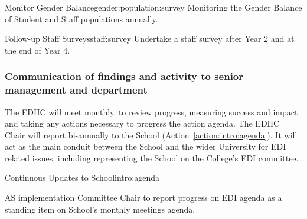 \newcommand{\actgenbalpopsurvey}{Monitoring the Gender Balance of Student and Staff populations annually.
}
\begin{actionblock}{\ksspace{}Monitor Gender Balance}{gender:population:survey}
\actgenbalpopsurvey
\hfill{
    \hypersetup{hidelinks}
    \hyperlink{a3}{\gotoactionsymbol{}}
}
\end{actionblock}

\newcommand{\actstaffsurvey}{Undertake a staff survey after Year 2 and at the end of Year 4.
}
\begin{actionblock}{\ksspace{}Follow-up Staff Surveys}{staff:survey}
\actstaffsurvey
\hfill{
    \hypersetup{hidelinks}
    \hyperlink{a3}{\gotoactionsymbol{}}
}
\end{actionblock}



\subsubsection{Communication of findings and activity to senior management and department}

The EDIIC will meet monthly, to review progress, measuring success and impact and taking any actions necessary to progress the action agenda. The EDIIC Chair will report bi-annually to the School (Action~\ref{action:intro:agenda}).
It will act as the main conduit between the School and the wider University for EDI related issues, including representing the School on the College's EDI committee.


\newcommand{\actintroagenda}{
AS implementation Committee Chair to report progress on EDI agenda as a standing item on School’s monthly meetings agenda.
}
\begin{actionblock}{\ksspace{}Continuous Updates to School}{intro:agenda}
\actintroagenda
\hfill{
    \hypersetup{hidelinks}
    \hyperlink{a5}{\gotoactionsymbol{}}
}
\end{actionblock}







